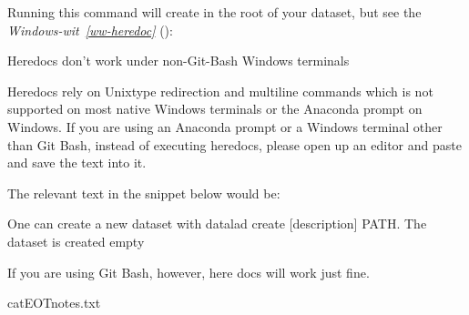 \sphinxAtStartPar
Running this command will create  in the
root of your  dataset, but see the \textit{Windows-wit}~{\windowswiticoninline}\textit{\ref{ww-heredoc}} {\hyperref[\detokenize{basics/101-103-modify:ww-heredoc}]{}} ():

\ignorespaces \begin{windowswit}[label={ww-heredoc}, before title={\thetcbcounter\ }, float, floatplacement=tb, check odd page=true]{Heredocs don’t work under non-Git-Bash Windows terminals}
\label{\detokenize{basics/101-103-modify:ww-heredoc}}

\sphinxAtStartPar
Heredocs rely on Unix\sphinxhyphen{}type redirection and multi\sphinxhyphen{}line commands \textendash{} which is not supported on most native Windows terminals or the Anaconda prompt on Windows.
If you are using an Anaconda prompt or a Windows terminal other than Git Bash, instead of executing heredocs, please open up an editor and paste and save the text into it.

\sphinxAtStartPar
The relevant text in the snippet below would be:

\begin{sphinxVerbatim}[commandchars=\\\{\}]
One can create a new dataset with \PYGZsq{}datalad create [\PYGZhy{}\PYGZhy{}description] PATH\PYGZsq{}.
The dataset is created empty
\end{sphinxVerbatim}

\sphinxAtStartPar
If you are using Git Bash, however, here docs will work just fine.


\end{windowswit}

\ignorespaces 
\def\sphinxLiteralBlockLabel{\label{\detokenize{basics/101-103-modify:index-3}}}
\begin{sphinxVerbatim}[commandchars=\\\{\}]
cat\PYGZlt{}\PYGZlt{}EOT\PYGZgt{}notes.txt

\end{sphinxVerbatim}

